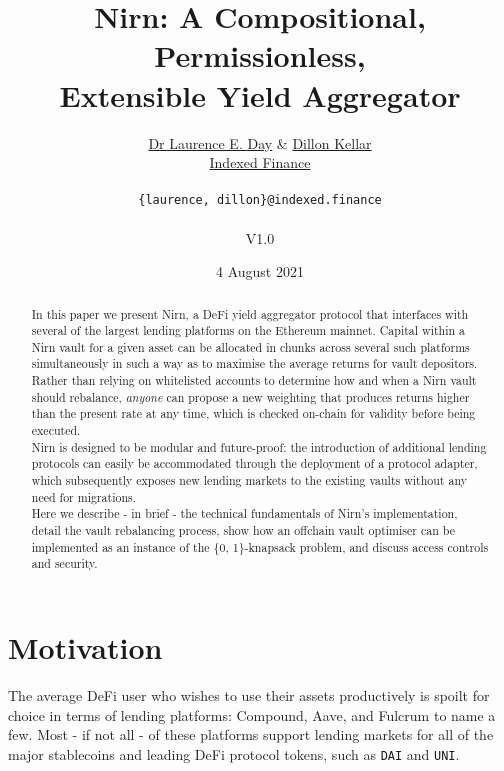 \documentclass{article}
\title{Nirn: A Compositional, Permissionless,\\ Extensible Yield Aggregator}
\author{\href{https://twitter.com/laurence_e_day}{Dr Laurence E. Day} \& \href{https://twitter.com/d1ll0nk}{Dillon Kellar}\\\href{https://indexed.finance}{Indexed Finance}\\\\\texttt{\{laurence, dillon\}@indexed.finance}\\\\V1.0}
\date{4 August 2021}
\begin{document}
\maketitle

\begin{abstract}
\noindent
    In this paper we present Nirn, a DeFi yield aggregator protocol that interfaces with several of the largest lending platforms on the Ethereum mainnet. Capital within a Nirn vault for a given asset can be allocated in chunks across several such platforms simultaneously in such a way as to maximise the average returns for vault depositors.\\
    
    \noindent
    Rather than relying on whitelisted accounts to determine how and when a Nirn vault should rebalance, \textit{anyone} can propose a new weighting that produces returns higher than the present rate at any time, which is checked on-chain for validity before being executed.\\
    
    \noindent
    Nirn is designed to be modular and future-proof: the introduction of additional lending protocols can easily be accommodated through the deployment of a protocol adapter, which subsequently exposes new lending markets to the existing vaults without any need for migrations.\\
    
    \noindent
    Here we describe - in brief - the technical fundamentals of Nirn's implementation, detail the vault rebalancing process, show how an offchain vault optimiser can be implemented as an instance of the \{0, 1\}-knapsack problem, and discuss access controls and security.\\
    
\end{abstract}

\newpage
\tableofcontents

\newpage
\section{Motivation}

The average DeFi user who wishes to use their assets productively is spoilt for choice in terms of lending platforms: Compound, Aave, and Fulcrum to name a few. Most - if not all - of these platforms support lending markets for all of the major stablecoins and leading DeFi protocol tokens, such as \texttt{DAI} and \texttt{UNI}.\\
\end{document}
